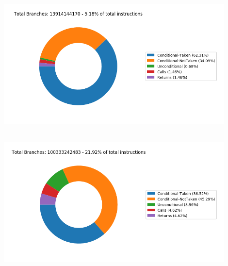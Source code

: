    \begin{minipage}{\textwidth}
      \begin{center}
         \\
         \vspace{3mm}
         \includegraphics[width=0.9\textwidth, frame]{./graphs/4-1/456-hmmer.png}
         \vspace{6mm}
      \end{center}
   \end{minipage}

   \begin{minipage}{\textwidth}
      \begin{center}
         \\
         \vspace{3mm}
         \includegraphics[width=0.9\textwidth, frame]{./graphs/4-1/458-sjeng.png}
         \vspace{6mm}
      \end{center}
   \end{minipage}

